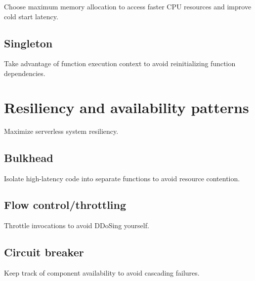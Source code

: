 Choose maximum memory allocation to access faster CPU resources and improve cold start latency.

\subsection{Singleton} \label{subsubsec:Singleton}

Take advantage of function execution context to avoid reinitializing function dependencies.

\section{Resiliency and availability patterns} \label{sec:resiliencyPatterns}

Maximize serverless system resiliency.

\subsection{Bulkhead} \label{subsubsec:Bulkhead}

Isolate high-latency code into separate functions to avoid resource contention.

\subsection{Flow control/throttling} \label{subsubsec:Flow control/throttling}

Throttle invocations to avoid DDoSing yourself.

\subsection{Circuit breaker} \label{subsubsec:Circuit breaker}

Keep track of component availability to avoid cascading failures.

